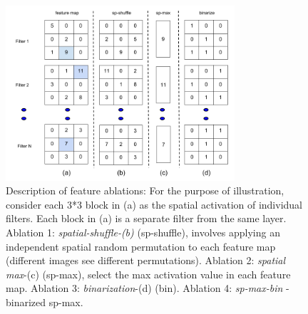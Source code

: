 \documentclass[runningheads]{llncs}
\begin{document}
\begin{figure}[t!]
\centering
\includegraphics[height=6.5cm]{images/features1.png}
\caption{Description of feature ablations: For the purpose of illustration, consider each 3*3 block in (a) as the spatial activation of individual filters. Each block in (a) is a separate filter from the same layer. Ablation 1: \textit{spatial-shuffle-(b)} (sp-shuffle), involves applying an independent spatial random permutation to each feature map (different images see different permutations). Ablation 2: \textit{spatial max}-(c) (sp-max), select the max activation value in each feature map. Ablation 3: \textit{binarization}-(d) (bin). Ablation 4: \textit{sp-max-bin} - binarized sp-max.}
\label{fig:features}
\end{figure}
\end{document}
